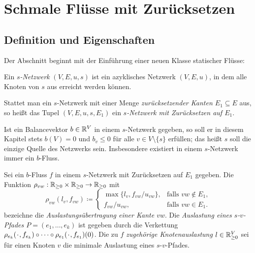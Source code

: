 \chapter{Schmale Flüsse mit Zurücksetzen}\label{chapter-thin-flows}
\newcommand*{\PlH}{\makebox[1ex]{\textbf{$\cdot$}}}

\section{Definition und Eigenschaften}

Der Abschnitt beginnt mit der Einführung einer neuen Klasse statischer Flüsse:

\begin{definition}[$s$-Netzwerk]
	Ein \emph{$s$-Netzwerk} $(V, E, u, s)$ ist ein azyklisches Netzwerk $(V, E, u)$, in dem alle Knoten von $s$ aus erreicht werden können.

	 Stattet man ein $s$-Netzwerk mit einer Menge \emph{zurücksetzender Kanten $E_1\subseteq E$} aus, so heißt das Tupel $(V, E, u, s, E_1)$ ein \emph{$s$-Netzwerk mit Zurücksetzen auf $E_1$}.
\end{definition}

Ist ein Balancevektor $b\in\mathbb{R}^V$ in einem $s$-Netzwerk gegeben, so soll er in diesem Kapitel stets $b(V) = 0$ und $b_v\leq 0$ für alle $v\in V\setminus \{ s \}$ erfüllen; das heißt $s$ soll die einzige Quelle des Netzwerks sein.
Insbesondere existiert in einem $s$-Netzwerk immer ein $b$-Fluss.



\begin{definition}
	Sei ein $b$-Fluss $f$ in einem $s$-Netzwerk mit Zurück\-setzen auf $E_1$ gegeben.
	Die Funktion $\rho_{vw}: \mathbb{R}_{\geq 0}\times \mathbb{R}_{\geq 0} \to \mathbb{R}_{\geq 0}$  mit \[ \rho_{vw}(l_v, f_{vw}) \coloneq \begin{cases}
		\max\{ l_v, f_{vw} / u_{vw} \}, & \text{falls $vw\notin E_1$,}\\
		f_{vw} / u_{vw}, & \text{falls $vw\in E_1$.}
	\end{cases}
	\]
	bezeichne die \emph{Auslastungsübertragung einer Kante $vw$}.
	Die \emph{Auslastung eines $s$-$v$-Pfades $P=(e_1,\dots,e_k)$} ist gegeben durch die Verkettung $\rho_{e_k}(\PlH, f_{e_k})\circ \dots \circ \rho_{e_1}(\PlH, f_{e_1})(0)$.
	Die zu $f$ \emph{zugehörige Knotenauslastung $l\in\mathbb{R}_{\geq 0}^V$} sei für einen Knoten $v$ die minimale Auslastung eines $s$-$v$-Pfades.
\end{definition}


